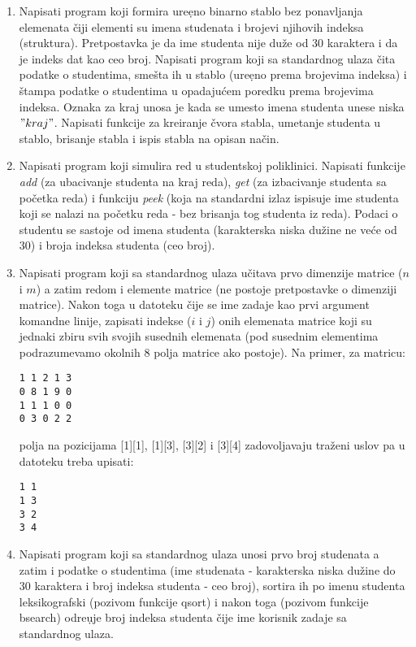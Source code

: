 \begin{enumerate}

\item Napisati program koji formira ure\d eno binarno stablo bez
ponavljanja elemenata \v ciji elementi su imena studenata i brojevi
njihovih indeksa (struktura). Pretpostavka je da ime studenta nije du\v ze
od $30$ karaktera i da je indeks dat kao ceo broj.
Napisati program koji sa standardnog ulaza \v cita podatke o studentima,
sme\v sta ih u stablo (ure\d eno prema brojevima indeksa) i \v stampa
podatke o studentima u opadaju\' cem poredku prema brojevima indeksa.
Oznaka za kraj unosa je kada se umesto imena studenta unese niska $"kraj"$.
Napisati funkcije za kreiranje \v cvora stabla, umetanje studenta u
stablo, brisanje stabla i ispis stabla na opisan na\v cin.

\item Napisati program koji simulira red u studentskoj poliklinici.
Napisati funkcije \emph{add} (za ubacivanje studenta na kraj reda),
\emph{get} (za izbacivanje studenta sa po\v cetka reda) i funkciju
\emph{peek} (koja na standardni izlaz ispisuje ime studenta koji se
nalazi na po\v cetku reda - bez brisanja tog studenta iz reda).
Podaci o studentu se sastoje od imena studenta (karakterska niska du\v zine
ne ve\' ce od $30$) i broja indeksa studenta (ceo broj).

\item Napisati program koji sa standardnog ulaza u\v citava prvo
dimenzije matrice ($n$ i $m$) a zatim redom i elemente matrice (ne
postoje pretpostavke o dimenziji matrice). Nakon toga u datoteku \v cije
se ime zadaje kao prvi argument komandne linije, zapisati indekse ($i$ i $j$)
onih elemenata matrice koji su jednaki zbiru svih svojih susednih elemenata
(pod susednim elementima podrazumevamo okolnih $8$ polja matrice ako postoje).
Na primer, za matricu:
\begin{verbatim}
1 1 2 1 3
0 8 1 9 0
1 1 1 0 0
0 3 0 2 2
\end{verbatim}
polja na pozicijama [1][1], [1][3], [3][2] i [3][4] zadovoljavaju tra\v zeni
uslov pa u datoteku treba upisati:
\begin{verbatim}
1 1
1 3
3 2
3 4
\end{verbatim}
\item Napisati program koji sa standardnog ulaza unosi prvo broj studenata
a zatim i podatke o studentima
(ime studenata - karakterska niska du\v zine do $30$ karaktera i
broj indeksa studenta - ceo broj), sortira ih po imenu studenta
leksikografski (pozivom funkcije qsort) i
nakon toga (pozivom funkcije bsearch) odre\d uje broj indeksa studenta
\v cije ime korisnik zadaje sa standardnog ulaza.
\end{enumerate}

